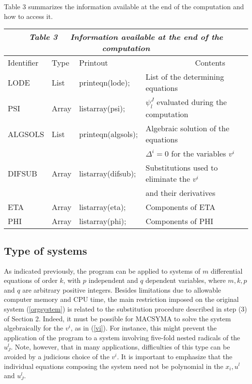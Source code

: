 {\nopagebreak
Table 3 summarizes the information available at the end of
the computation and how to access it. 

\nopagebreak
\begin{center}
\begin{tabular}{||l||l|l|l||} \hline \hline
\multicolumn{4}{||c||}{\em Table 3 $\;\;\;$ Information available at the end
of the computation}  \\ \hline
Identifier   &  Type & Printout & 
$\;\;\;\;\;\;\;\;\;\;\;\;\;\;\;\;\;\;\;\;\;\;\;$Contents \\ \hline \hline 
LODE & List & printeqn(lode);  
& List of the determining equations   \\ \hline
PSI  & Array & listarray(psi); 
& $\displaystyle \psi^{J}_{l}$ evaluated during the computation   \\ \hline 
ALGSOLS & List & printeqn(algsols); 
& Algebraic solution of the equations  \\ 
      &     &  & $\Delta^{i}=0$ for the variables $v^i$ \\ \hline
DIFSUB & Array & listarray(difsub); &
Substitutions used to eliminate the $v^i$ \\ 
      &        &  & and their derivatives  \\ \hline 
ETA & Array & listarray(eta); & Components of ETA \\ \hline
PHI & Array & listarray(phi); & Components of PHI \\ \hline \hline
\end{tabular}
\end{center}

\nopagebreak
\subsection{Type of systems}

\nopagebreak
As indicated previously, the program can be applied to systems of
$m$ differential equations of order $k$, with $p$ independent and $q$
dependent variables, where $m, k, p$ and $q$ are arbitrary positive
integers.  
Besides limitations due to allowable computer
memory and CPU time, the main restriction imposed on the original system
(\ref{orgsystem}) is related to the substitution procedure described 
in step (3) of Section 2.  
Indeed, it must be possible for MACSYMA to solve
the system algebraically for the $v^i$, as in (\ref{vi}).
For instance, this might prevent the application of the program
to a system involving five-fold nested radicals of the $u^{l}_{J}.$
Note, however, that in many applications, difficulties of this
type can be avoided by a judicious choice of the $v^{i}.$
It is important to emphasize that the individual
equations composing the system need not be polynomial in
the $x_i, u^l$ and $u^{l}_{J}.$  

}
